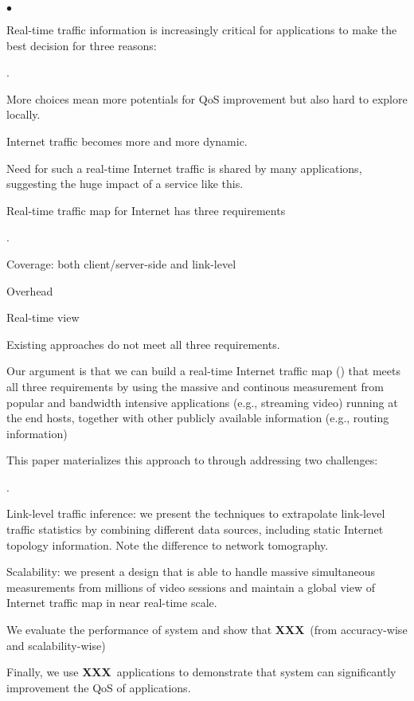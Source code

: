 \documentclass[10pt,twocolumn]{article}
\newcommand{\fillme}{{\bf XXX}~}
\newcounter{packednmbr}
\newenvironment{packedenumerate}{\begin{list}{\thepackednmbr.}{\usecounter{packednmbr}\setlength{\itemsep}{0.5pt}\addtolength{\labelwidth}{-4pt}\setlength{\leftmargin}{\labelwidth}\setlength{\listparindent}{\parindent}\setlength{\parsep}{1pt}\setlength{\topsep}{0pt}}}{\end{list}}
\newenvironment{packeditemize}{\begin{list}{$\bullet$}{\setlength{\itemsep}{0.5pt}\addtolength{\labelwidth}{-4pt}\setlength{\leftmargin}{\labelwidth}\setlength{\listparindent}{\parindent}\setlength{\parsep}{1pt}\setlength{\topsep}{0pt}}}{\end{list}}
\begin{document}
\begin{packeditemize}
	\item Real-time traffic information is increasingly critical for applications to make the best decision for three reasons:
	\begin{packedenumerate}
		\item More choices mean more potentials for QoS improvement but also hard to explore locally.
		\item Internet traffic becomes more and more dynamic.
		\item Need for such a real-time Internet traffic is shared by many applications, suggesting the huge impact of a service like this.
	\end{packedenumerate}
	\item Real-time traffic map for Internet has three requirements
	\begin{packedenumerate}
		\item Coverage: both client/server-side and link-level
		\item Overhead
		\item Real-time view
	\end{packedenumerate}
	\item Existing approaches do not meet all three requirements.  
	\item Our argument is that we can build a real-time Internet traffic map (\itm) that meets all three requirements by using the massive and continous measurement from popular and bandwidth intensive applications (e.g., streaming video) running at the end hosts, together with other publicly available information (e.g., routing information)
	\item This paper materializes this approach to \itm through addressing two challenges:
	\begin{packedenumerate}
		\item Link-level traffic inference: we present the techniques to extrapolate link-level traffic statistics by combining different data sources, including static Internet topology information. Note the difference to network tomography.
		\item Scalability: we present a design that is able to handle massive simultaneous measurements from millions of video sessions and maintain a global view of Internet traffic map in near real-time scale.
	\end{packedenumerate}
	\item We evaluate the performance of \itm system and show that \fillme (from accuracy-wise and scalability-wise)
	\item Finally, we use \fillme applications to demonstrate that \itm system can significantly improvement the QoS of applications.
\end{packeditemize}
\end{document}
